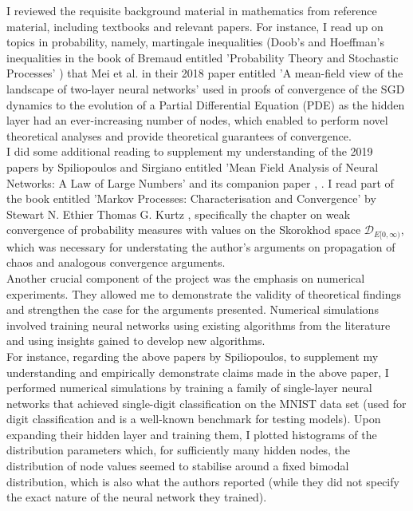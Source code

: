 \documentclass{article}
\theoremstyle{mystyle}
\begin{document}
I reviewed the requisite background material in mathematics from reference material, including textbooks and relevant papers. For instance, I read up on topics in probability, namely, martingale inequalities (Doob's and Hoeffman's inequalities in the book of Bremaud entitled 'Probability Theory and Stochastic Processes' \cite{bremaud2020probability}) that Mei et al. in their 2018 paper entitled 'A mean-field view of the landscape of two-layer neural networks' used in proofs of convergence of the SGD dynamics to the evolution of a Partial Differential Equation (PDE) as the hidden layer had an ever-increasing number of nodes, which enabled to perform novel theoretical analyses and provide theoretical guarantees of convergence.\\

I did some additional reading to supplement my understanding of the 2019 papers by Spiliopoulos and Sirgiano entitled 'Mean Field Analysis of Neural Networks: A Law of Large Numbers' and its companion paper \cite{sirignano2019meanfieldanalysisclt}, \cite{sirignano2019meanfieldanalysislln} . I read part of the book entitled 'Markov Processes: Characterisation and Convergence' by Stewart N. Ethier Thomas G. Kurtz \cite{ethier2009markov}, specifically the chapter on weak convergence of probability measures with values on the Skorokhod space $\mathcal{D}_{E[0, \infty)}$, which was necessary for understating the author's arguments on propagation of chaos and analogous convergence arguments. \\

Another crucial component of the project was the emphasis on numerical experiments. They allowed me to demonstrate the validity of theoretical findings and strengthen the case for the arguments presented. Numerical simulations involved training neural networks using existing algorithms from the literature and using insights gained to develop new algorithms. \\

For instance, regarding the above papers by Spiliopoulos, to supplement my understanding and empirically demonstrate claims made in the above paper, I performed numerical simulations by training a family of single-layer neural networks that achieved single-digit classification on the MNIST data set (used for digit classification and is a well-known benchmark for testing models). Upon expanding their hidden layer and training them, I plotted histograms of the distribution parameters which, for sufficiently many hidden nodes, the distribution of node values seemed to stabilise around a fixed bimodal distribution, which is also what the authors reported (while they did not specify the exact nature of the neural network they trained). \\
\end{document}
